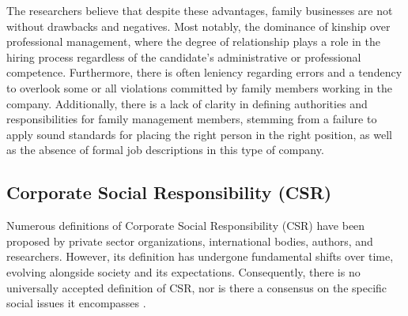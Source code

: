 \documentclass{NSP1}
\begin{document}
The researchers believe that despite these advantages, family businesses are not without drawbacks and negatives. Most notably, the dominance of kinship over professional management, where the degree of relationship plays a role in the hiring process regardless of the candidate's administrative or professional competence. Furthermore, there is often leniency regarding errors and a tendency to overlook some or all violations committed by family members working in the company. Additionally, there is a lack of clarity in defining authorities and responsibilities for family management members, stemming from a failure to apply sound standards for placing the right person in the right position, as well as the absence of formal job descriptions in this type of company.

\subsection{Corporate Social Responsibility (CSR)}
Numerous definitions of Corporate Social Responsibility (CSR) have been proposed by private sector organizations, international bodies, authors, and researchers. However, its definition has undergone fundamental shifts over time, evolving alongside society and its expectations. Consequently, there is no universally accepted definition of CSR, nor is there a consensus on the specific social issues it encompasses \cite{ref5}.
\end{document}
